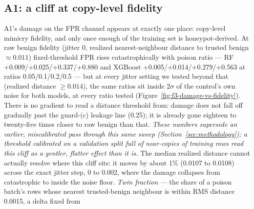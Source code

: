 \subsection{A1: a cliff at copy-level fidelity}
A1's damage on the FPR channel appears at exactly one place: copy-level mimicry fidelity, and
only once enough of the training set is honeypot-derived. At raw benign fidelity (jitter 0,
realized nearest-neighbour distance to trusted benign $\approx0.011$) fixed-threshold FPR rises
catastrophically with poison ratio — RF +0.009/\allowbreak+0.025/\allowbreak+0.337/\allowbreak+0.880
and XGBoost +0.005/\allowbreak+0.014/\allowbreak+0.279/\allowbreak+0.563 at ratios
0.05/0.1/0.2/0.5 — but at every jitter setting we tested
beyond that (realized distance $\ge0.014$), the same ratios sit inside $2\sigma$ of the
control's own noise for both models, at every ratio tested (Figure~\ref{fig:f3-damage-vs-fidelity}).
There is no gradient to read a distance threshold from: damage does not fall off gradually past
the guard-(c) leakage line (0.25); it is already gone eighteen to twenty-five times closer to
raw benign than that. \emph{These numbers supersede an earlier, miscalibrated pass through this
same sweep (Section~\ref{sec:methodology}); a threshold calibrated on a validation split full of
near-copies of training rows read this cliff as a gentler, flatter effect than it is.}
The median realized distance cannot actually resolve where this cliff sits: it moves by about
1\% (0.0107 to 0.0108) across the exact jitter step, 0 to 0.002, where the damage collapses from
catastrophic to inside the noise floor. \emph{Twin fraction} — the share of a poison batch's
rows whose nearest trusted-benign neighbour is within RMS distance 0.0015, a delta fixed from
